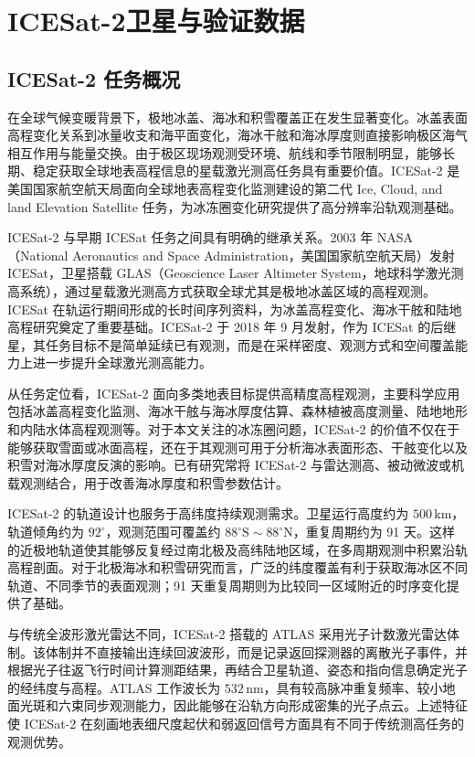 \cleardoublepage

\section{ICESat-2卫星与验证数据}

\subsection{ICESat-2 任务概况}
在全球气候变暖背景下，极地冰盖、海冰和积雪覆盖正在发生显著变化。冰盖表面高程变化关系到冰量收支和海平面变化，海冰干舷和海冰厚度则直接影响极区海气相互作用与能量交换。由于极区现场观测受环境、航线和季节限制明显，能够长期、稳定获取全球地表高程信息的星载激光测高任务具有重要价值。ICESat-2 是美国国家航空航天局面向全球地表高程变化监测建设的第二代 Ice, Cloud, and land Elevation Satellite 任务，为冰冻圈变化研究提供了高分辨率沿轨观测基础\citep{ICESat2_MissionOverview}。

ICESat-2 与早期 ICESat 任务之间具有明确的继承关系。2003 年 NASA（National Aeronautics and Space Administration，美国国家航空航天局）发射 ICESat，卫星搭载 GLAS（Geoscience Laser Altimeter System，地球科学激光测高系统），通过星载激光测高方式获取全球尤其是极地冰盖区域的高程观测。ICESat 在轨运行期间形成的长时间序列资料，为冰盖高程变化、海冰干舷和陆地高程研究奠定了重要基础。ICESat-2 于 2018 年 9 月发射，作为 ICESat 的后继星，其任务目标不是简单延续已有观测，而是在采样密度、观测方式和空间覆盖能力上进一步提升全球激光测高能力\citep{Zhu2020_ICESat2_ATLAS_Review,ICESat2_MissionOverview}。

从任务定位看，ICESat-2 面向多类地表目标提供高精度高程观测，主要科学应用包括冰盖高程变化监测、海冰干舷与海冰厚度估算、森林植被高度测量、陆地地形和内陆水体高程观测等。对于本文关注的冰冻圈问题，ICESat-2 的价值不仅在于能够获取雪面或冰面高程，还在于其观测可用于分析海冰表面形态、干舷变化以及积雪对海冰厚度反演的影响。已有研究常将 ICESat-2 与雷达测高、被动微波或机载观测结合，用于改善海冰厚度和积雪参数估计\citep{Kwok2017}。

ICESat-2 的轨道设计也服务于高纬度持续观测需求。卫星运行高度约为 \(500\,\mathrm{km}\)，轨道倾角约为 \(92^\circ\)，观测范围可覆盖约 \(88^\circ\mathrm{S}\sim88^\circ\mathrm{N}\)，重复周期约为 91 天。这样的近极地轨道使其能够反复经过南北极及高纬陆地区域，在多周期观测中积累沿轨高程剖面。对于北极海冰和积雪研究而言，广泛的纬度覆盖有利于获取海冰区不同轨道、不同季节的表面观测；91 天重复周期则为比较同一区域附近的时序变化提供了基础。

与传统全波形激光雷达不同，ICESat-2 搭载的 ATLAS 采用光子计数激光雷达体制。该体制并不直接输出连续回波波形，而是记录返回探测器的离散光子事件，并根据光子往返飞行时间计算测距结果，再结合卫星轨道、姿态和指向信息确定光子的经纬度与高程。ATLAS 工作波长为 \(532\,\mathrm{nm}\)，具有较高脉冲重复频率、较小地面光斑和六束同步观测能力，因此能够在沿轨方向形成密集的光子点云。上述特征使 ICESat-2 在刻画地表细尺度起伏和弱返回信号方面具有不同于传统测高任务的观测优势。

